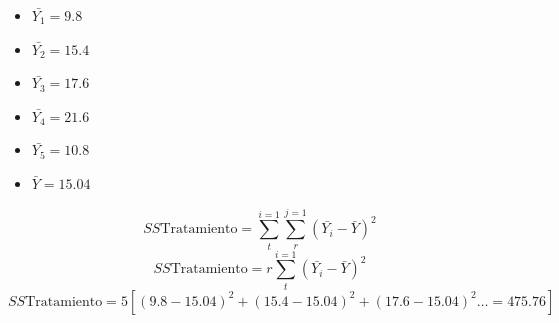 \documentclass{article}
\begin{document}
\begin{itemize}
    \item $\bar{Y_1} = 9.8$
    \item $\bar{Y_2} = 15.4$
    \item $\bar{Y_3} = 17.6$
    \item $\bar{Y_4} = 21.6$
    \item $\bar{Y_5} = 10.8$
    \item $\bar{Y} = 15.04$
\end{itemize}

\[SS\text{Tratamiento} = \sum_{t}^{i=1}\sum_{r}^{j=1}(\bar{Y_i} - \bar{Y})^2\]
\[SS\text{Tratamiento} = r \sum_{t}^{i=1} (\bar{Y_i} - \bar{Y})^2\]
\[SS\text{Tratamiento} = 5 \left[(9.8 - 15.04)^2 + (15.4-15.04)^2 + (17.6 - 15.04)^2 \dots = 475.76\right]\]
\end{document}
